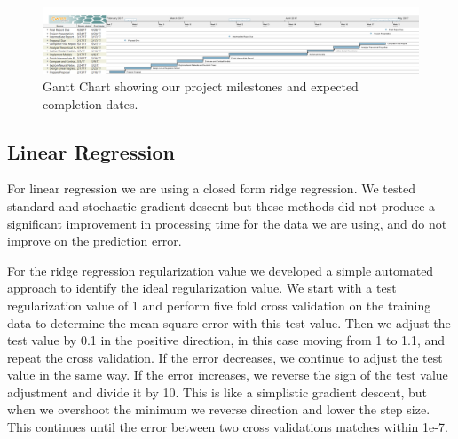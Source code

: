 \documentclass[10pt]{article}
\begin{document}
	\begin{figure}[h]
	    \centering
	    \includegraphics[width=\textwidth]{Schedule/ProjectSchedule.png}
	    \caption{Gantt Chart showing  our project milestones and expected completion dates.}
	    \label{fig:ganttchart}
	\end{figure}
	\begin{multicols}{2}
		\subsection{Linear Regression}
			For linear regression we are using a closed form ridge regression. We tested standard and stochastic gradient descent but these methods did not produce a significant improvement in processing time for the data we are using, and do not improve on the prediction error.
		\par
			For the ridge regression regularization value we developed a simple automated approach to identify the ideal regularization value. We start with a test regularization value of 1 and perform five fold cross validation on the training data to determine the mean square error with this test value. Then we adjust the test value by 0.1 in the positive direction, in this case moving from 1 to 1.1, and repeat the cross validation. If the error decreases, we continue to adjust the test value in the same way. If the error increases, we reverse the sign of the test value adjustment and divide it by 10. This is like a simplistic gradient descent, but when we overshoot the minimum we reverse direction and lower the step size. This continues until the error between two cross validations matches within 1e-7.
		\par
		\begin{center}
                  \captionsetup{type=figure}

\end{center}
\end{multicols}
\end{document}
